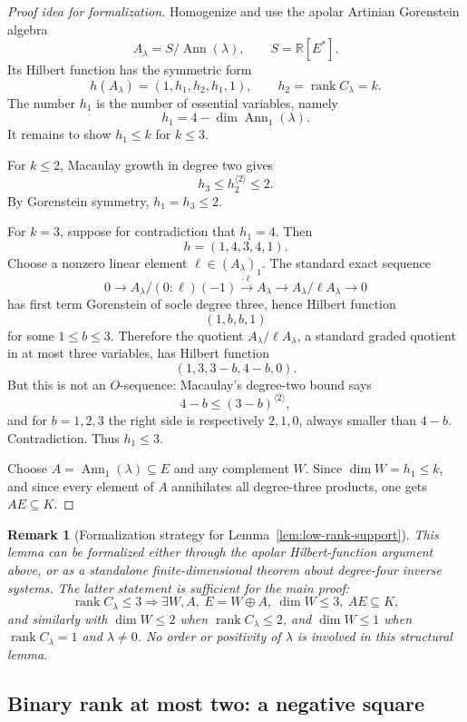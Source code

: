 \documentclass[11pt]{article}
\newtheorem{remark}[theorem]{Remark}
\newcommand{\R}{\mathbb R}
\newcommand{\rank}{\operatorname{rank}}
\newcommand{\Ann}{\operatorname{Ann}}
\begin{document}
\begin{proof}[Proof idea for formalization]
Homogenize and use the apolar Artinian Gorenstein algebra
\[
A_\lambda=S/\Ann(\lambda),
\qquad S=\R[E^*].
\]
Its Hilbert function has the symmetric form
\[
h(A_\lambda)=(1,h_1,h_2,h_1,1),
\qquad
h_2=\rank C_\lambda=k.
\]
The number \(h_1
\) is the number of essential variables, namely
\[
h_1=4-\dim\Ann_1(\lambda).
\]
It remains to show \(h_1\le k\) for \(k\le3\).

For \(k\le2\), Macaulay growth in degree two gives
\[
h_3\le h_2^{\langle2\rangle}\le2.
\]
By Gorenstein symmetry, \(h_1=h_3\le2\).

For \(k=3\), suppose for contradiction that \(h_1=4\).  Then
\[
h=(1,4,3,4,1).
\]
Choose a nonzero linear element \(\ell\in(A_\lambda)_1\).  The standard exact sequence
\[
0\to A_\lambda/(0:\ell)(-1)
\xrightarrow{\cdot\ell}
A_\lambda
\to
A_\lambda/\ell A_\lambda
\to0
\]
has first term Gorenstein of socle degree three, hence Hilbert function
\[
(1,b,b,1)
\]
for some \(1\le b\le3\).  Therefore the quotient \(A_\lambda/\ell A_\lambda\), a standard graded quotient in at most three variables, has Hilbert function
\[
(1,3,3-b,4-b,0).
\]
But this is not an \(O\)-sequence: Macaulay's degree-two bound says
\[
4-b\le(3-b)^{\langle2\rangle},
\]
and for \(b=1,2,3\) the right side is respectively \(2,1,0\), always smaller than \(4-b\).  Contradiction.  Thus \(h_1\le3\).

Choose \(A=\Ann_1(\lambda)\subseteq E\) and any complement \(W\).  Since \(\dim W=h_1\le k\), and since every element of \(A\) annihilates all degree-three products, one gets \(AE\subseteq K\).
\end{proof}

\begin{remark}[Formalization strategy for Lemma~\ref{lem:low-rank-support}]
This lemma can be formalized either through the apolar Hilbert-function argument above, or as a standalone finite-dimensional theorem about degree-four inverse systems.  The latter statement is sufficient for the main proof:
\[
\rank C_\lambda\le3
\Rightarrow
\exists W,A,
\ E=W\oplus A,\ \dim W\le3,\ AE\subseteq K,
\]
and similarly with \(\dim W\le2\) when \(\rank C_\lambda\le2\), and \(\dim W\le1\) when \(\rank C_\lambda=1\) and \(\lambda\ne0\).
No order or positivity of \(\lambda\) is involved in this structural lemma.
\end{remark}

\subsection{Binary rank at most two: a negative square}
\end{document}
